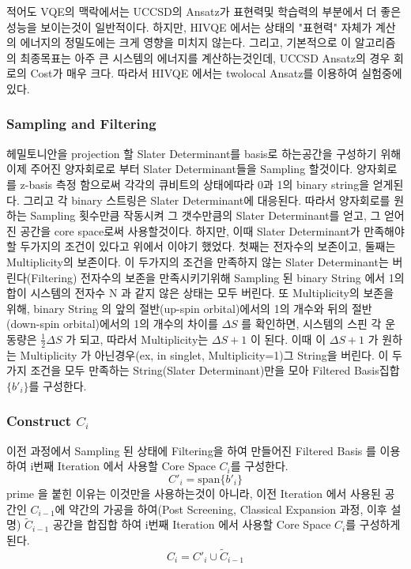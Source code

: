 \documentclass[11pt]{article}
\begin{document}
적어도 VQE의 맥락에서는 UCCSD의 Ansatz가 표현력및 학습력의 부분에서 더 좋은 성능을 보이는것이 일반적이다. 하지만, HIVQE 에서는 상태의 "표현력" 자체가 계산의 에너지의 정밀도에는 크게 영향을 미치지 않는다. 
그리고, 기본적으로 이 알고리즘의 최종목표는 아주 큰 시스템의 에너지를 계산하는것인데, UCCSD Ansatz의 경우 회로의 Cost가 매우 크다. 
따라서 HIVQE 에서는 twolocal Ansatz를 이용하여 실험중에 있다. 

\subsubsection{Sampling and Filtering}
헤밀토니안을 projection 할 Slater Determinant를 basis로 하는공간을 구성하기 위해 
이제 주어진 양자회로로 부터 Slater Determinant들을 Sampling 할것이다. 
양자회로를 z-basis 측정 함으로써 각각의 큐비트의 상태에따라 0과 1의 binary string을 얻게된다. 
그리고 각 binary 스트링은 Slater Determinant에 대응된다. 
따라서 양자회로를 원하는 Sampling 횟수만큼 작동시켜 그 갯수만큼의 Slater Determinant를 얻고, 그 얻어진 공간을 core space로써 사용할것이다. 
하지만, 이때 Slater Determinant가 만족해야할 두가지의 조건이 있다고 위에서 이야기 했었다.
첫째는 전자수의 보존이고, 둘째는 Multiplicity의 보존이다.
이 두가지의 조건을 만족하지 않는 Slater Determinant는 버린다(Filtering)
전자수의 보존을 만족시키기위해 Sampling 된 binary String 에서 1의 합이 시스템의 전자수 N 과 같지 않은 상태는 모두 버린다. 
또 Multiplicity의 보존을 위해, binary String 의 앞의 절반(up-spin orbital)에서의 1의 개수와 뒤의 절반(down-spin orbital)에서의 1의 개수의 차이를 \(\Delta S\) 를 확인하면,
시스템의 스핀 각 운동량은 \(\frac{1}{2}\Delta S\) 가 되고, 따라서 Multiplicity는 \(\Delta S + 1\) 이 된다. 
이때 이 \(\Delta S + 1\) 가 원하는 Multiplicity 가 아닌경우(ex, in singlet, Multiplicity=1)그 String을 버린다. 
이 두가지 조건을 모두 만족하는 String(Slater Determinant)만을 모아 Filtered Basis집합 \(\{b'_i\}\)를 구성한다. 

\subsubsection{Construct \(C_i\)}
이전 과정에서 Sampling 된 상태에 Filtering을 하여 만들어진 Filtered Basis 를 이용하여 i번째 Iteration 에서 사용할 Core Space \(C_i\)를 구성한다. 
\[
C'_i = \text{span}\{b'_i\}
\]
prime 을 붙힌 이유는 이것만을 사용하는것이 아니라, 이전 Iteration 에서 사용된 공간인 \(C_{i-1}\)에 약간의 가공을 하여(Post Screening, Classical Expansion 과정, 이후 설명) \(\tilde{C}_{i-1}\) 공간을 합집합 하여
i번째 Iteration 에서 사용할 Core Space \(C_i\)를 구성하게 된다. 
\[
C_i = C'_i \cup \tilde{C}_{i-1}
\]
\end{document}
